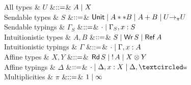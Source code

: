 \begin{figure*}[t]
  \begin{grammar}
    All types
    & $U$
    &$\mathrel{::=}$& $A \mathrel{\mid} X$
    \\
    Sendable types
    & $S$
    &$\mathrel{::=}$& $\text{\textsf{Unit}} \mathrel{\mid} A ** B \mathrel{\mid} {A} + {B} \mathrel{\mid} U
    {->}_{\pi} U$
    \\
    Sendable typings
    & ${\Gamma}_S$
    &$\mathrel{::=}$& $\cdot \mathrel{\mid} {\Gamma}_S,x:S$
    \\
    Intuitionistic types
    & $A,B$
    &$\mathrel{::=}$& $S \mathrel{\mid} \text{\textsf{Wr}}\,S \mathrel{\mid} \text{\textsf{Ref}}\,A$
    \\
    Intuitionistic typings
    & $\Gamma$
    &$\mathrel{::=}$& $\cdot \mathrel{\mid} \Gamma,x:A$
    \\
    Affine types
    & $X,Y$
    &$\mathrel{::=}$& $\text{\textsf{Rd}}\,S \mathrel{\mid} {!}\,{A} \mathrel{\mid}
    {X}\otimes{Y}$
    \\
    Affine typings
    & $\Delta$
    &$\mathrel{::=}$& $\emptyctxt \bnfalt \Delta,x:X \bnfalt \Delta, \wrtok$
    \\
    Multiplicities
    & $\pi$
    &$\mathrel{::=}$& $1 \mathrel{\mid} \infty$
  \end{grammar}
  \begin{comment}
  \begin{grammar}
    All types
    & $U$
    &$\bnfas$& $A \bnfalt X$
    \\    
    Sendable types
    & $S$
    &$\bnfas$& $\tyUnit \bnfalt \tyProd{A}{B} \bnfalt \tySum{A}{B} \bnfalt A ->
    B \bnfalt X \multimap Y$
    \\
    Sendable typings
    & ${\Gamma}_S$
    &$\bnfas$& $\emptyctxt \bnfalt {\Gamma}_S,x:S$
    \\
    Intuitionistic types
    & $A,B$
    &$\bnfas$& $S \bnfalt \tyWr{S} \bnfalt \tyRef{A}$
    \\
    Intuitionistic typings
    & $\Gamma$
    &$\bnfas$& $\emptyctxt \bnfalt \Gamma,x:A$
    \\

\end{comment}
\end{figure*}
